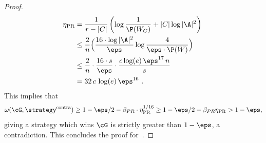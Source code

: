 \begin{proof}
	\begin{align*}
		\eta_{\text{PR}} &= \frac{1}{r-|C|} \left ( \log \frac{1}{\P(W_C)} + |C| \log |\A|^2 \right)\;\\
		& \leq \frac{2}{n} \Big ( \frac{16 \cdot  \log |\A|^2}{\eps} \log \frac{4}{\eps \cdot \P(W)} \Big) \\
		&\leq \frac{2}{n} \cdot \frac{16 \cdot s}{\eps} \cdot \frac{c \log (e) \, \eps^{17} \, n}{s} \\
		&= 32 \, c \, \log(e) \, \eps^{16}~.
	\end{align*}
	This implies that 
	\begin{equation}
		\omega(\cG, \strategy^{\text{contra}}) \geq 1 - \eps/2 - \beta_{PR} \cdot  \eta_{\text{PR}}^{1/16} \geq   1 - \eps/2 - \beta_{PR}  \eta_{\text{PR}} > 1 - \eps, 
	\end{equation}
	\noindent giving a strategy which wins $\cG$ is strictly greater than $1 - \eps$, a contradiction. This concludes the proof for~.
\end{proof}
